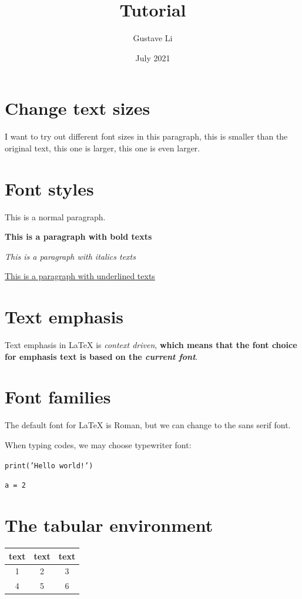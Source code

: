 \documentclass[a4paper, 12pt]{article}
\title{Tutorial}
\author{Gustave Li}
\date{July 2021}
\begin{document}
\maketitle

\section{Change text sizes} \label{sec: text size}

I want to try out different font sizes in this paragraph, this is {\scriptsize smaller than} the original text, this one is {\Large larger}, this one is {\huge even larger}.

\section{Font styles}

\setlength{\parindent}{1cm} 
\noindent This is a normal paragraph.

\noindent \textbf{This is a paragraph with bold texts}

\noindent \textit{This is a paragraph with italics texts}

\noindent \underline{This is a paragraph with underlined texts}

\section{Text emphasis}
Text emphasis in {\LaTeX} is \emph{context driven}, \textbf{which means that the font choice for emphasis text is based on the \emph{current font}}.

\section{Font families}
The default font for {\LaTeX} is Roman, but we can change to \textsf{the sans serif font}.

When typing codes, we may choose typewriter font:
\begin{center}
    \texttt{print('Hello world!')}
    
    \texttt{a = 2}
\end{center}

\section{The tabular environment}
\begin{center}
    \begin{tabular}{|c|c|c|}
    \hline
    text & text & text \\
    \hline
    1    &    2 & 3 \\
    4 & 5 & 6 \\
    \hline
    \end{tabular}
\end{center}
\end{document}
